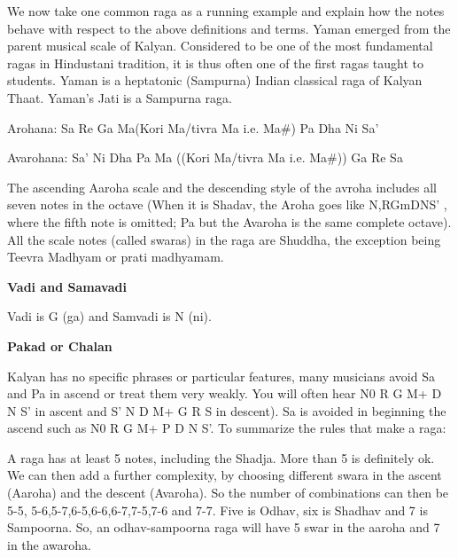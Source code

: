 We now take one common raga as a running example and explain how the notes behave with respect to the above definitions and terms. Yaman emerged from the parent musical scale of Kalyan. Considered to be one of the most fundamental ragas in Hindustani tradition, it is thus often one of the first ragas taught to students. Yaman is a heptatonic (Sampurna) Indian classical raga of Kalyan Thaat. Yaman's Jati is a Sampurna raga.
\par
Arohana: Sa Re Ga Ma(Kori Ma/tivra Ma i.e. Ma\#) Pa Dha Ni Sa'
\par
Avarohana: Sa' Ni Dha Pa Ma ((Kori Ma/tivra Ma i.e. Ma\#)) Ga Re Sa
\par
The ascending Aaroha scale and the descending style of the avroha includes all seven notes in the octave (When it is Shadav, the Aroha goes like N,RGmDNS' , where the fifth note is omitted; Pa but the Avaroha is the same complete octave). All the scale notes (called swaras) in the raga are Shuddha, the exception being Teevra Madhyam or prati madhyamam.
\par
\begin{flushleft}
  \textbf{Vadi and Samavadi} \par
\end{flushleft}
Vadi is G (ga) and Samvadi is N (ni). \par
\begin{flushleft}
  \textbf{Pakad or Chalan} \par
\end{flushleft}
Kalyan has no specific phrases or particular features, many musicians avoid Sa and Pa in ascend or treat them very weakly. You will often hear N0 R G M+ D N S' in ascent and S' N D M+ G R S in descent). Sa is avoided in beginning the ascend such as N0 R G M+ P D N S'.
To summarize the rules that make a raga: \par
A raga has at least 5 notes, including the Shadja. More than 5 is definitely ok. We can then add a further complexity, by choosing different swara in the ascent (Aaroha) and the descent (Avaroha). So the number of combinations can then be 5-5, 5-6,5-7,6-5,6-6,6-7,7-5,7-6 and 7-7. Five is Odhav, six is Shadhav and 7 is Sampoorna. So, an odhav-sampoorna raga will have 5 swar in the aaroha and 7 in the awaroha.
